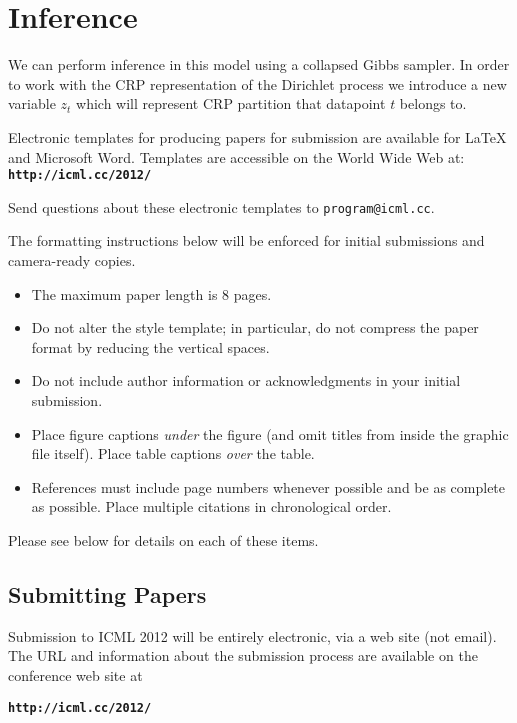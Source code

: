 \documentclass{article}
\begin{document}
\section{Inference}
\label{inference}

We can perform inference in this model using a collapsed Gibbs sampler. In order to work with the CRP representation of the Dirichlet process we introduce a new variable $z_t$ which will represent CRP partition that datapoint $t$ belongs to.






\newpage
\newpage

Electronic templates for producing papers for submission are available
for \LaTeX\/ and Microsoft Word. Templates are accessible on the World
Wide Web at:\\
\textbf{\texttt{http://icml.cc/2012/}}

\noindent
Send questions about these electronic templates to
\texttt{program@icml.cc}.

The formatting instructions below will be enforced for initial submissions and camera-ready copies. 
\begin{itemize}
\item The maximum paper length is 8 pages.
\item Do not alter the style template; in particular, do not compress the paper format by reducing the vertical spaces.
\item Do not include author information or acknowledgments in your
  initial submission. 
\item Place figure captions {\em under} the figure (and omit titles from
  inside the graphic file itself).  Place table captions {\em over}
  the table.
\item References must include page numbers whenever possible and be as
  complete as possible.  Place multiple citations in chronological order.  
\end{itemize}
Please see below for details on each of these items.

\subsection{Submitting Papers}

Submission to ICML 2012 will be entirely electronic, via a web site
(not email).  The URL and information about the submission process
are available on the conference web site at

\textbf{\texttt{http://icml.cc/2012/}}
\end{document}
